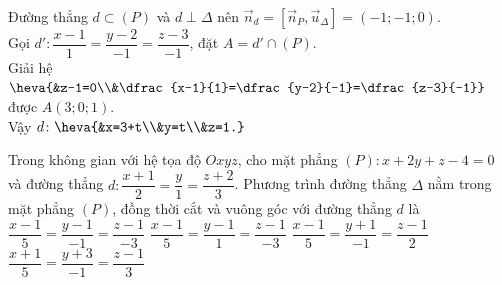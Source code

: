 \begin{ex}
{		Đường thẳng $d\subset (P)$ và $d\perp\Delta$ nên  $\overrightarrow{n}_{d}=[\overrightarrow{n}_{P},\overrightarrow{u}_{\Delta}]=(-1;-1;0)$.\\
		Gọi $d'\colon\dfrac{x-1}{1}=\dfrac{y-2}{-1}=\dfrac{z-3}{-1}$,  đặt $A=d'\cap (P)$.\\
		Giải  hệ $\heva{&z-1=0\\&\dfrac{x-1}{1}=\dfrac{y-2}{-1}=\dfrac{z-3}{-1}}$ được $A(3;0;1)$.\\
		Vậy $d\colon\heva{&x=3+t\\&y=t\\&z=1.}$ 
	 }
\end{ex}

\begin{ex}%
	Trong không gian với hệ tọa độ $Oxyz$, cho mặt phẳng $(P) \colon x+2y+z-4=0$ và đường thẳng $d \colon \dfrac{x+1}{2}=\dfrac{y}{1}=\dfrac{z+2}{3}$. Phương trình  đường thẳng $\Delta$ nằm trong mặt phẳng $(P)$, đồng thời cắt và vuông góc với đường thẳng $d$ là
	 \choice
		{\True $\dfrac{x-1}{5}=\dfrac{y-1}{-1}=\dfrac{z-1}{-3}$} 
		{$\dfrac{x-1}{5}=\dfrac{y-1}{1}=\dfrac{z-1}{-3}$} 
		{$\dfrac{x-1}{5}=\dfrac{y+1}{-1}=\dfrac{z-1}{2}$} 
		{$\dfrac{x+1}{5}=\dfrac{y+3}{-1}=\dfrac{z-1}{3}$} 
\end{ex}

